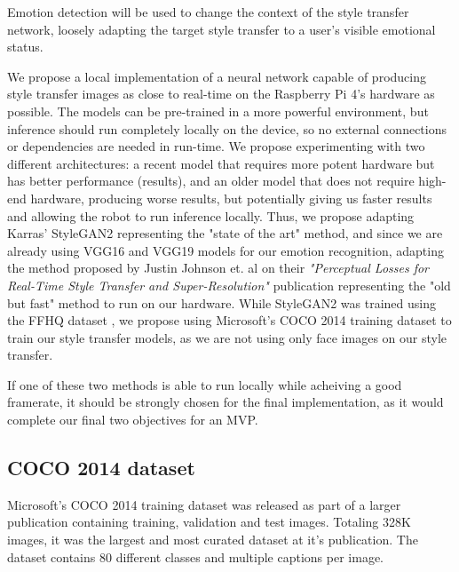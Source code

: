 Emotion detection will be used to change the context of the style transfer network, loosely adapting the target style transfer to a user's visible emotional status.


We propose a local implementation of a neural network capable of producing style transfer images as close to real-time on the Raspberry Pi 4's hardware as possible. The models can be pre-trained in a more powerful environment, but inference should run completely locally on the device, so no external connections or dependencies are needed in run-time. We propose experimenting with two different architectures: a recent model that requires more potent hardware but has better performance (results), and an older model that does not require high-end hardware, producing worse results, but potentially giving us faster results and allowing the robot to run inference locally. Thus, we propose adapting Karras' StyleGAN2 representing the "state of the art" method, and since we are already using VGG16 and VGG19 models for our emotion recognition, adapting the method proposed by Justin Johnson et. al on their \emph{"Perceptual Losses for Real-Time Style Transfer
and Super-Resolution"} \cite{Johnson2016Perceptual} publication representing the "old but fast" method to run on our hardware.
While StyleGAN2 was trained using the FFHQ dataset \cite{nvlabs_2019}, we propose using Microsoft's COCO 2014 training dataset\cite{DBLP:journals/corr/LinMBHPRDZ14} to train our style transfer models, as we are not using only face images on our style transfer. 

If one of these two methods is able to run locally while acheiving a good framerate, it should be strongly chosen for the final implementation, as it would complete our final two objectives for an MVP.



\subsection{COCO 2014 dataset}

Microsoft's COCO 2014 training dataset was released as part of a larger publication containing training, validation and test images. Totaling 328K images, it was the largest and most curated dataset at it's publication. The dataset contains 80 different classes and multiple captions per image. 
